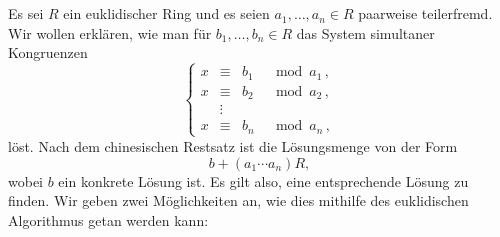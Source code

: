 \section{}

Es sei $R$ ein euklidischer Ring und es seien $a_1, \dotsc, a_n \in R$ paarweise teilerfremd.
Wir wollen erklären, wie man für $b_1, \dotsc, b_n \in R$ das System simultaner Kongruenzen
\[
  \left\{
    \begin{array}{rcll}
      x &\equiv& b_1 & \mod a_1 \,, \\
      x &\equiv& b_2 & \mod a_2 \,, \\
        &\vdots&     &              \\
      x &\equiv& b_n & \mod a_n \,,
    \end{array}
  \right.
\]
löst.
Nach dem chinesischen Restsatz ist die Lösungsmenge von der Form
\[
  b + (a_1 \dotsm a_n) R,
\]
wobei $b$ ein konkrete Lösung ist.
Es gilt also, eine entsprechende Lösung zu finden.
Wir geben zwei Möglichkeiten an, wie dies mithilfe des euklidischen Algorithmus getan werden kann:
